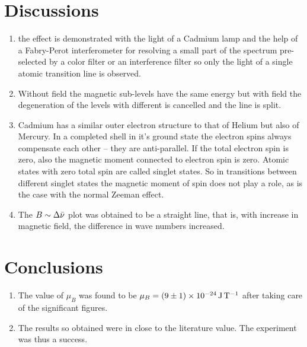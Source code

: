 \documentclass[%
 reprint,
nofootinbib,
 amsmath,amssymb,
 aps,
floatfix,
]{revtex4-2}
\begin{document}
        

\section{Discussions}
\begin{enumerate}
    \item the effect is demonstrated with the light of a Cadmium lamp and the help of a Fabry-Perot interferometer for resolving a small part of the spectrum pre-selected by a color filter or an interference filter so only the light of a single atomic transition line is observed.
    \item Without field the magnetic sub-levels have the same energy but with field the degeneration of the levels with different is cancelled and the line is split.
    \item Cadmium has a similar outer electron structure to that of Helium but also of Mercury. In a completed shell in it's ground state the electron spins always compensate each other – they are anti-parallel. If the total electron spin is zero, also the magnetic moment connected to electron spin is zero. Atomic states with zero total spin are called singlet states. So in transitions between different singlet states the magnetic moment of spin does not play a role, as is the case with the normal Zeeman effect.
    \item The $B \sim \Delta \Bar{\nu}$ plot was obtained to be a straight line, that is, with increase in magnetic field, the difference in wave numbers increased.
\end{enumerate}



\section{Conclusions}
\begin{enumerate}
    \item The value of $\mu_B$ was found to be $\mu_B = \SI[separate-uncertainty=true]{9 \pm 1e-24}{\joule \per \tesla}$ after taking care of the significant figures.
    \item The results so obtained were in close to the literature value. The experiment was thus a success.
\end{enumerate}




\end{document}
